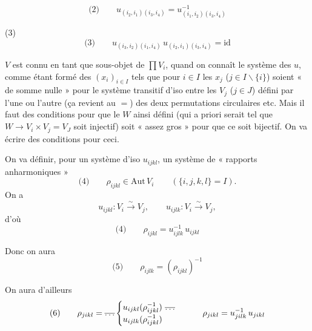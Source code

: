 \documentclass[11pt,a4paper]{article}
\begin{document}

\[
\text{(2)}\qquad u_{(i_2,i_1)(i_3,i_4)} = u_{(i_1,i_2)(i_3,i_4)}^{-1}
\]


(3)  
\[
\text{(3)}\qquad u_{(i_3,i_2)(i_1,i_4)}\,u_{(i_2,i_1)(i_3,i_4)} = \mathrm{id}
\]

$V$ est connu en tant que sous-objet de $\prod V_i$, quand on connaît le système des $u$, comme étant formé des $(x_i)_{i\in I}$ tels que pour  $i\in I$  les $x_j$ ($j\in I\smallsetminus\{i\}$) soient « de somme nulle » pour le système transitif d'iso entre les $V_j$ ($j\in J$) défini par l'une ou l'autre (ça revient au $=$) des deux permutations circulaires etc. Mais il faut des conditions pour que le $W$ ainsi défini (qui a priori serait tel que $W\to V_i\times V_j = V_J$  soit injectif) soit « assez gros » pour que ce soit bijectif. On va écrire des conditions pour ceci.

On va définir, pour un système d'iso $u_{ijkl}$, un système de « rapports anharmoniques »
\[
\text{(4)}\qquad \rho_{ijkl} \in \mathrm{Aut}\,V_i \qquad (\{i,j,k,l\} = I).
\]
On a
\[
u_{ijkl} : V_i \xrightarrow{\ \sim\ } V_j, \qquad u_{ijlk} : V_i \xrightarrow{\ \sim\ } V_j,
\]
d'où
\[
\text{(4)}\qquad \rho_{ijkl} = u_{ijlk}^{-1}\,u_{ijkl}
\]

Donc on aura
\[
\text{(5)}\qquad \rho_{ijlk} = (\rho_{ijkl})^{-1}
\]

On aura d'ailleurs
\[
\text{(6)}\qquad \rho_{jikl} = \text{\struck{$\ldots$}}
\begin{cases}
u_{ijkl}(\rho_{ijkl}^{-1})\ \text{\struck{$\ldots$}}\\
u_{ijlk}(\rho_{ijkl}^{-1})
\end{cases}
\qquad \rho_{jikl} = u_{jilk}^{-1}\,u_{jikl}
\]
\end{document}
